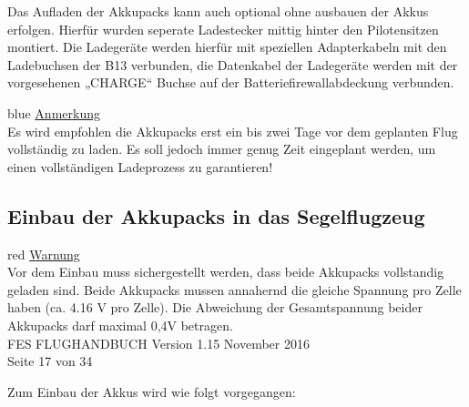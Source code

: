 Das Aufladen der Akkupacks kann auch optional ohne ausbauen der Akkus erfolgen. Hierfür wurden seperate Ladestecker mittig hinter den Pilotensitzen montiert. 
Die Ladegeräte werden hierfür mit speziellen Adapterkabeln mit den Ladebuchsen der B13 verbunden, die Datenkabel der Ladegeräte werden mit der vorgesehenen „CHARGE“ Buchse auf der Batteriefirewallabdeckung verbunden.\\

\begin{color}{blue}
\large{\underline{Anmerkung}}\\
Es wird empfohlen die Akkupacks erst ein bis zwei Tage vor
dem geplanten Flug vollständig zu laden. Es soll jedoch immer genug Zeit
eingeplant werden, um einen vollständigen Ladeprozess zu garantieren!
\end{color}

\subsection{Einbau der Akkupacks in das Segelflugzeug}

\begin{color}{red}
\large{\underline{Warnung}}\\
Vor dem Einbau muss sichergestellt werden, dass beide
Akkupacks vollstandig geladen sind. Beide Akkupacks mussen annahernd die
gleiche Spannung pro Zelle haben (ca. 4.16 V pro Zelle). Die Abweichung der
Gesamtspannung beider Akkupacks darf maximal 0,4V betragen.\\
FES FLUGHANDBUCH Version 1.15 November 2016\\
Seite 17 von 34
\end{color}

Zum Einbau der Akkus wird wie folgt vorgegangen:

